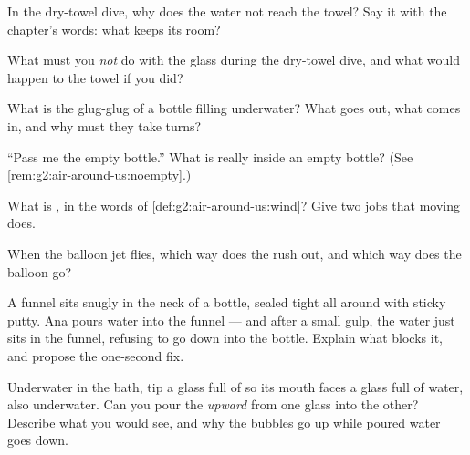 \begin{exercise}[$\star$]\label{exo:g2:air-around-us:3}
In the dry-towel dive, why does the water not reach the towel? Say
it with the chapter's words: what keeps its room?
\end{exercise}

\begin{exercise}[$\star$]\label{exo:g2:air-around-us:4}
What must you \emph{not} do with the glass during the dry-towel
dive, and what would happen to the towel if you did?
\end{exercise}

\begin{exercise}[$\star$]\label{exo:g2:air-around-us:5}
What is the glug-glug of a bottle filling underwater? What goes out,
what comes in, and why must they take turns?
\end{exercise}

\begin{exercise}[$\star$]\label{exo:g2:air-around-us:6}
``Pass me the empty bottle.'' What is really inside an empty
bottle? (See \cref{rem:g2:air-around-us:noempty}.)
\end{exercise}

\begin{exercise}[$\star$]\label{exo:g2:air-around-us:7}
What is , in the words of \cref{def:g2:air-around-us:wind}? Give
two jobs that moving  does.
\end{exercise}

\begin{exercise}[$\star$]\label{exo:g2:air-around-us:8}
When the balloon jet flies, which way does the  rush out, and
which way does the balloon go?
\end{exercise}

\begin{exercise}[$\star\star$]\label{exo:g2:air-around-us:9}
A funnel sits snugly in the neck of a bottle, sealed tight all
around with sticky putty. Ana pours water into the funnel --- and
after a small gulp, the water just sits in the funnel, refusing to
go down into the bottle. Explain what blocks it, and propose the
one-second fix.
\end{exercise}

\begin{exercise}[$\star\star$]\label{exo:g2:air-around-us:10}
Underwater in the bath, tip a glass full of  so its mouth faces a
glass full of water, also underwater. Can you pour the 
\emph{upward} from one glass into the other? Describe what you would
see, and why the bubbles go up while poured water goes down.
\end{exercise}
